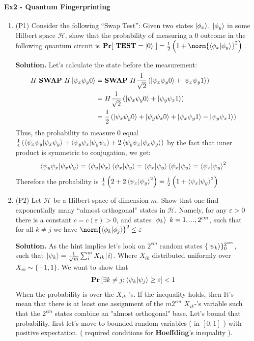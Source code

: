 \documentclass{article}
\begin{document}
\paragraph{Ex2 - Quantum Fingerprinting }
\begin{enumerate}
    \item (P1) Consider the following “Swap Test”: Given two states \( \ket{\phi_x}\), \( \ket{\phi_y}\) in some Hilbert space \( \mathcal{H}\),
show that the probability of measuring a \(0\) outcome in the following quantum circuit is \( \mathbf{Pr} [ \mathbf{ \ TEST} = \ket{0} \   ]  =  \frac{1}{2} \left(1 + \norm{\braket{\phi_x| \phi_y}}^2 \right) \) .

\textbf{Solution.} Let's calculate the state before the measurement: 
\[ \begin{split}
    H \ \mathbf{SWAP} \ H \ket{\psi_x \psi_y 0} & = \mathbf{SWAP} \ H \frac{1}{\sqrt{2}}\left( \ket{\psi_x \psi_y 0} + \ket{\psi_x \psi_y 1}\right) \\
    & = H \frac{1}{\sqrt{2}}\left( \ket{\psi_x \psi_y 0} + \ket{\psi_y \psi_x 1}\right)\\ &= \frac{1}{2}\left(  \ket{\psi_x \psi_y 0} + \ket{\psi_y \psi_x 0}  + \ket{\psi_x \psi_y 1} - \ket{\psi_y \psi_x 1}\right)
\end{split}  \]
Thus, the probability to measure \( 0 \) equal \( \frac{1}{4}\left(  \braket{ \psi_x \psi_y | \psi_x \psi_y } + \braket{\psi_y \psi_x | \psi_y \psi_x } + 2 \braket{\psi_y \psi_x|\psi_x \psi_y} \right) \)
by the fact that inner product is symmetric to conjugation, we get: 
\[ \braket{\psi_y \psi_x|\psi_x \psi_y} = \braket{\psi_y | \psi_x}\braket{\psi_x | \psi_y} = \braket{\psi_x | \psi_y}\braket{\psi_x | \psi_y} = \braket{\psi_x | \psi_y}^2 \] Therefore the probability is \( \frac{1}{4}\left(2 + 2 \braket{\psi_x | \psi_y}^2 \right) =  \frac{1}{2}\left(1 +  \braket{\psi_x | \psi_y}^2 \right)   \)  

\item  (P2) Let \( \mathcal{H}\) be a Hilbert space of dimension \(m\). Show that one find exponentially many “almost orthogonal” states in \( \mathcal{H}\). Namely, for any \( \varepsilon > 0 \)   there is a constant \(c = c(\varepsilon) > 0 \), and states \( \ket{\phi_k} \ k = 1,...,2^{cm} \), such that for all \(k \neq j \) we have \( \norm{\braket{\phi_k| \phi_j}}^2 \le \varepsilon \) 


\textbf{Solution.} As the hint implies let's look on \( 2^{cm} \) random states \( \{ \ket{\psi_k} \}_{0}^{2^{cm}}\), such that \( \ket{\psi_k} = \frac{1}{\sqrt{m}}\sum_{i}^{m}{X_{ik}\ket{i}} \). Where \( X_{ik} \) distributed uniformly over \(X_{ik} \sim  \{ -1 , 1 \} \). We want to show that \[
\mathbf{Pr} \left[ \exists k \neq j ; \braket{\psi_k| \psi_j} \ge \varepsilon \right] < 1 \] When the probability is over the \( X_{ik} \)-'s. If the inequality holds, then It's mean that there is at least one assignment of the \( m2^{cm} \) \(X_{ik}\)-'s variable such that the \( 2^{cm} \) states combine an "almost orthogonal" base. Let's bound that probability, first let's move to bounded random variables ( in \( [0,1] \) ) with positive expectation. ( required conditions for \textbf{Hoeffding}'s inequality ).  


\end{enumerate}
\end{document}
